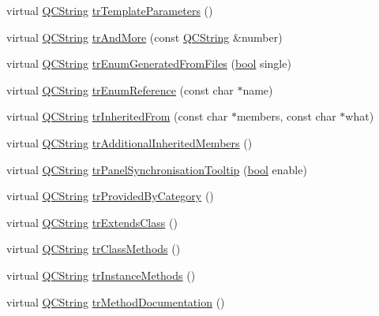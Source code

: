 \begin{DoxyCompactItemize}
\item 
virtual \hyperlink{class_q_c_string}{Q\+C\+String} \hyperlink{class_translator_dutch_a72b684311f1026c8af57f7dc4990222f}{tr\+Template\+Parameters} ()
\item 
virtual \hyperlink{class_q_c_string}{Q\+C\+String} \hyperlink{class_translator_dutch_ab75e4abf688b919d1e4d591609d8a687}{tr\+And\+More} (const \hyperlink{class_q_c_string}{Q\+C\+String} \&number)
\item 
virtual \hyperlink{class_q_c_string}{Q\+C\+String} \hyperlink{class_translator_dutch_a31d3ea98c32a9fbdd2bcfe21f89b9cc3}{tr\+Enum\+Generated\+From\+Files} (\hyperlink{qglobal_8h_a1062901a7428fdd9c7f180f5e01ea056}{bool} single)
\item 
virtual \hyperlink{class_q_c_string}{Q\+C\+String} \hyperlink{class_translator_dutch_aa2a32e10d3ced164adcd563bac05b1b6}{tr\+Enum\+Reference} (const char $\ast$name)
\item 
virtual \hyperlink{class_q_c_string}{Q\+C\+String} \hyperlink{class_translator_dutch_aec0b11002e013150545da621cea9f585}{tr\+Inherited\+From} (const char $\ast$members, const char $\ast$what)
\item 
virtual \hyperlink{class_q_c_string}{Q\+C\+String} \hyperlink{class_translator_dutch_aea70696a03972772e91e355296fb3681}{tr\+Additional\+Inherited\+Members} ()
\item 
virtual \hyperlink{class_q_c_string}{Q\+C\+String} \hyperlink{class_translator_dutch_a491405ec8591e8b7b193ced27969d4d4}{tr\+Panel\+Synchronisation\+Tooltip} (\hyperlink{qglobal_8h_a1062901a7428fdd9c7f180f5e01ea056}{bool} enable)
\item 
virtual \hyperlink{class_q_c_string}{Q\+C\+String} \hyperlink{class_translator_dutch_ae882bdbafbc3dfba727e85dc527b170e}{tr\+Provided\+By\+Category} ()
\item 
virtual \hyperlink{class_q_c_string}{Q\+C\+String} \hyperlink{class_translator_dutch_ad6c339e700baa233aa1ced07c4b1ede2}{tr\+Extends\+Class} ()
\item 
virtual \hyperlink{class_q_c_string}{Q\+C\+String} \hyperlink{class_translator_dutch_ab39d6fb44c4108793cf1a87900ab9aae}{tr\+Class\+Methods} ()
\item 
virtual \hyperlink{class_q_c_string}{Q\+C\+String} \hyperlink{class_translator_dutch_afb9b00e7ff7aa3acecd62fe0b35e2a52}{tr\+Instance\+Methods} ()
\item 
virtual \hyperlink{class_q_c_string}{Q\+C\+String} \hyperlink{class_translator_dutch_aeeabf211fdd1969c265ef65c27898a0c}{tr\+Method\+Documentation} ()

\end{DoxyCompactItemize}
